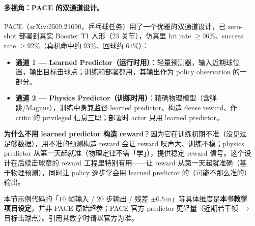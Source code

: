\paragraph{多视角：PACE 的双通道设计。}PACE（arXiv:2509.21690，乒乓球任务）用了一个优雅的双通道设计，已 zero-shot 部署到真实 Booster T1 人形（23 关节），仿真里 hit rate $\ge 96\%$、success rate $\ge 92\%$（真机命中约 $93\%$、回球约 $61\%$）\cite{tennis_pace2025}：

\begin{itemize}
  \item \textbf{通道 1 — Learned Predictor（运行时用）}：轻量预测器，输入近期球位置，输出目标击球点；训练和部署都用，其输出作为 policy observation 的一部分。
  \item \textbf{通道 2 — Physics Predictor（训练时用）}：精确物理模型（含弹跳/Magnus），训练中身兼监督 learned predictor、构造 dense reward、作 critic 的 privileged 信息三职；部署时 actor 只用 learned predictor。
\end{itemize}

\textbf{为什么不用 learned predictor 构造 reward}？因为它在训练初期不准（没见过足够数据），用不准的预测构造 reward 会让 reward 噪声大、训练不稳；physics predictor 从第一天起就准（物理定律不需「学」），提供稳定 reward 信号。这个设计在后续击球章的 reward 工程里特别有用——让 reward 从第一天起就准确（基于物理预测），同时让 policy 逐步学会用 learned predictor 的（可能不那么准的）输出。


\begin{finenote}
本节示例代码的「$10$ 帧输入 / $20$ 步输出 / 残差 $\pm 0.5$\,m」等具体维度是\textbf{本书教学项目设定}，并非 PACE 原始超参；PACE 官方 predictor 更轻量（近期若干帧 $\to$ 目标击球点）。引用其数字时请以官方为准。
\end{finenote}

